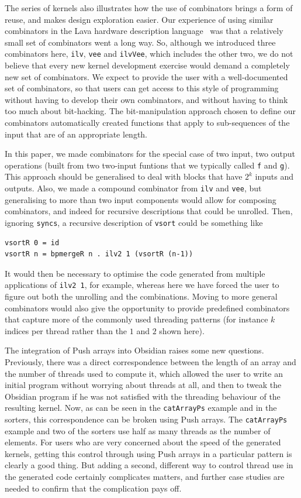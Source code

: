 \documentclass[]{sigplanconf}
\begin{document}
The series of kernels also illustrates how the use of combinators brings a form of reuse, and makes design exploration easier. Our experience of using similar combinators in the Lava hardware
description language~\cite{LavaSorter} was that a relatively small set of combinators went a long way. So, although we introduced three
combinators here, {\tt ilv}, {\tt vee} and {\tt ilvVee}, which
includes the other two, we do not believe that every new kernel development exercise would demand a completely new set of combinators.
We expect to provide the user with a well-documented set of combinators,
so that users can get access to this style of programming without having
to develop their own combinators, and without having to think too much
about bit-hacking.
The bit-manipulation approach chosen to define our combinators automatically
created functions that apply to sub-sequences of the input that
are of an appropriate length.

In this paper, we made combinators for the special case of two input, two
output operations (built from two two-input funtions that we typically called
{\tt f} and {\tt g}). 
This approach should be generalised to deal with blocks that have $2^k$ inputs
and outputs.
Also, we made a compound combinator from {\tt ilv} and {\tt vee},
but generalising to more than two input components would allow
for composing combinators, and indeed for recursive descriptions
that could be unrolled. Then, ignoring {\tt syncs}, a recursive description of
{\tt vsort} could be something like 
\begin{codesize}
\begin{verbatim}
vsortR 0 = id
vsortR n = bpmergeR n . ilv2 1 (vsortR (n-1))
\end{verbatim}
\end{codesize}
\noindent
It would then be necessary to optimise the code generated from
multiple applications of {\tt ilv2 1}, for example, whereas here
we have forced the user to figure out both the unrolling and the combinations.
Moving to more general combinators would also give the opportunity to
provide predefined combinators that capture more of the commonly used threading patterns (for instance $k$ indices per thread rather than the $1$ and $2$ shown here).

The integration of Push arrays into Obsidian raises some new questions.
Previously, there was a direct correspondence between the length 
of an array and the number of threads used to compute it, which
allowed the user to write an initial program without worrying about
threads at all, and then to tweak the Obsidian program if he was not satisfied
with the threading behaviour of the resulting kernel. 
Now, as can be seen in the {\tt catArrayPs} example and in the sorters, this correspondence
can be broken using Push arrays. The {\tt catArrayPs} example and two
of the sorters use half as many threads as the 
number of elements. For users who are very concerned about the speed of
the generated kernels, getting this control through using Push arrays in
a particular pattern is clearly a good thing. But adding a second, different
way to control thread use in the generated code certainly complicates matters, and further case studies are needed to confirm that the complication pays off.
\end{document}
